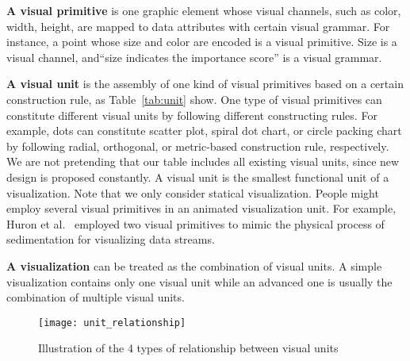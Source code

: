 \noindent
\textbf{A visual primitive} is one graphic element whose visual channels, such as color, width, height, are mapped to data attributes with certain visual grammar.  For instance, a point whose size and color are encoded is a visual primitive. Size is a visual channel, and``size indicates the importance score'' is a visual grammar. 

\noindent
\textbf{A visual unit} is the assembly of one kind of visual primitives based on a certain construction rule, as Table~\ref{tab:unit} show. 
One type of visual primitives can constitute different visual units by following different constructing rules. For example, dots can constitute scatter plot, spiral dot chart, or circle packing chart by following radial, orthogonal, or metric-based construction rule, respectively. We are not pretending that our table includes all existing visual units, since new design is proposed constantly. A visual unit is the smallest functional unit of a visualization. Note that we only consider statical visualization. People might employ several visual primitives in an animated visualization unit. For example, Huron et al.~\cite{huron_visual_2013} employed two visual primitives to mimic the physical process of sedimentation for visualizing data streams. 

\noindent
\textbf{A visualization} can be treated as the combination of visual units. A simple visualization contains only one visual unit while an advanced one is usually the combination of multiple visual units. 


\begin{figure}[tb]
 \centering %
 \texttt{[image: unit\_relationship]}
 \caption{Illustration of the 4 types of relationship between visual units}
 \label{fig:relationship}
\end{figure}

